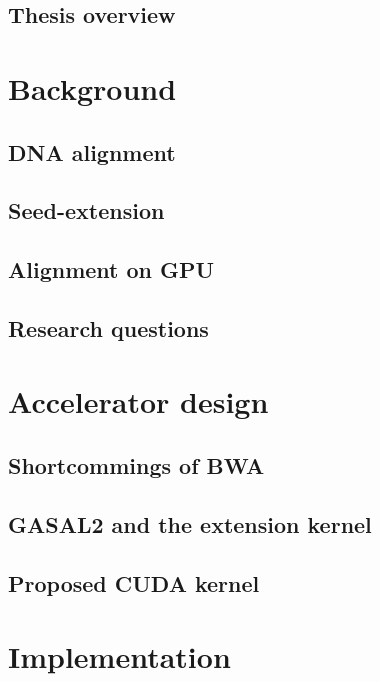 \documentclass[whitelogo]{tudelft-report}
\begin{document}
\section{Thesis overview}


\chapter{Background}
\label{chap:background}
\section{DNA alignment}


\section{Seed-extension}


\section{Alignment on GPU}


\section{Research questions}


\chapter{Accelerator design}
\label{chap:accel}


\section{Shortcommings of BWA}

\section{GASAL2 and the extension kernel}
	

\section{Proposed CUDA kernel}


\chapter{Implementation}
\label{chap:implementation}

\end{document}
